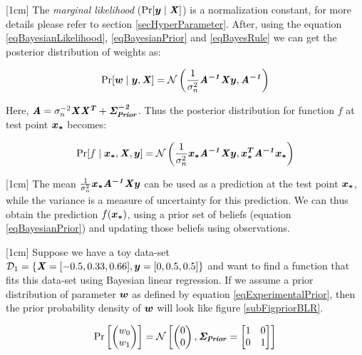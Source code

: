 [1cm]
The \textsl{marginal likelihood} ($\Pr[\boldsymbol{y} \mid \bm{\mathit{X}}]$) is a normalization constant, for more details please refer to section \ref{secHyperParameter}. After, using the equation \ref{eqBayesianLikelihood}, \ref{eqBayesianPrior} and \ref{eqBayesRule} we can get the posterior distribution of weights as:

\begin{equation}\label{eqBayesianPosterior}
\Pr[\boldsymbol{w} \mid \boldsymbol{y}, \bm{\mathit{X}}]  = \mathcal{N}\left ( \frac{1}{\sigma_{n}^{2}} \bm{\mathit{A^{-1}}}\bm{\mathit{X}}\boldsymbol{y} , \bm{\mathit{A^{-1}}} \right )
\end{equation}

Here, $\bm{\mathit{A}} = \sigma_{n}^{-2}\bm{\mathit{X}}\bm{\mathit{X^{T}}} + \bm{\mathit{\Sigma_{Prior}^{-2}}}$. Thus the posterior distribution for function $f$ at test point $\boldsymbol{x_{*}}$ becomes:

\begin{equation}\label{eqBayesianFunctionalPosterior}
\Pr[f \mid \boldsymbol{x_{*}}, \bm{\mathit{X}}, \boldsymbol{y}]  = \mathcal{N}\left ( \frac{1}{\sigma_{n}^{2}} \boldsymbol{x_{*}}\bm{\mathit{A^{-1}}}\bm{\mathit{X}}\boldsymbol{y} , \boldsymbol{x_{*}^T}\bm{\mathit{A^{-1}}}\boldsymbol{x_{*}} \right )
\end{equation}

[1cm]
The mean $\frac{1}{\sigma_{n}^{2}} \boldsymbol{x_{*}}\bm{\mathit{A^{-1}}}\bm{\mathit{X}}\boldsymbol{y}$ can be used as a prediction at the test point $\boldsymbol{x_{*}}$, while the variance is a measure of uncertainty for this prediction. We can thus obtain the prediction $f(\boldsymbol{x_{*}})$, using a prior set of beliefs (equation \ref{eqBayesianPrior}) and updating those beliefs using observations. 

\begin{mdframed}[hidealllines=true,backgroundcolor=lightgray!20]
[1cm]
Suppose we have a toy data-set $\mathcal{D}_{1} = \{\bm{\mathit{X}} = [-0.5, 0.33, 0.66], \boldsymbol{y} = [0, 0.5, 0.5]\}$ and want to find a function that fits this data-set using Bayesian linear regression. If we assume a prior distribution of parameter $\boldsymbol{w}$ as defined by equation \ref{eqExperimentalPrior}, then the prior probability density of $\boldsymbol{w}$ will look like figure \ref{subFigpriorBLR}.

\begin{equation}\label{eqExperimentalPrior}
\Pr \left [\begin{pmatrix}
w_{0}\\ 
w_{1}
\end{pmatrix} \right ] = \mathcal{N}\left [ \begin{pmatrix}
0\\ 
0
\end{pmatrix}, \bm{\mathit{\Sigma_{Prior}}} = \begin{bmatrix}
1 & 0\\ 
0 & 1
\end{bmatrix} \right ]
\end{equation}
\end{mdframed}

